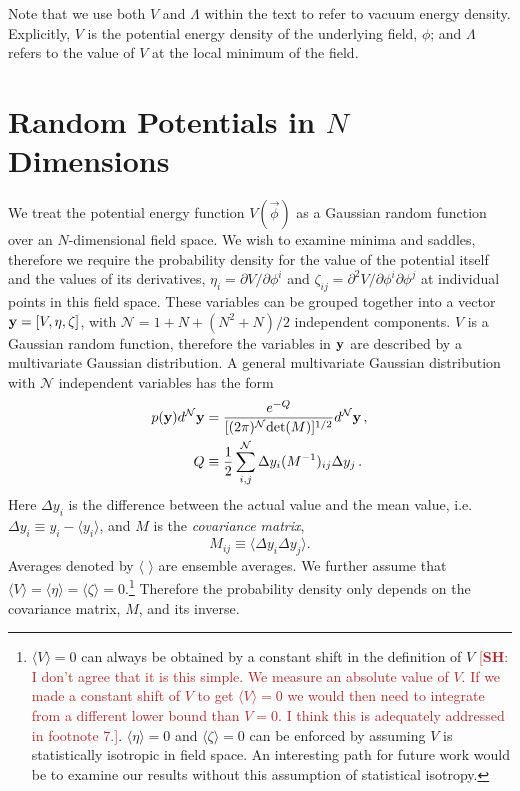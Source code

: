 \documentclass[12pt]{article}
\newcommand{\SH}[1]{\textcolor{brown}{[{\bf SH}: #1]}}
\begin{document}
Note that we use both $V$ and $\Lambda$ within the text to refer to vacuum energy density. Explicitly, $V$ is the potential energy density of the underlying field, $\phi$; and $\Lambda$ refers to the value of $V$ at the local minimum of the field.
 
 
\section{Random Potentials in $N$ Dimensions}

We treat the potential energy function $V({\vec{\phi}})$ as a Gaussian random function over an $N$-dimensional field space. We wish to examine minima and saddles, therefore we require the probability density for the value of the potential itself and the values of its derivatives, $\eta_i = \partial V/\partial \phi^i$ and $\zeta_{ij}=\partial^2 V/\partial \phi^i\partial \phi^j$ at individual points in this field space. These variables can be grouped together into a vector ${\bf y} = [V,\eta,\zeta]$, with $\mathcal{N}=1+N+(N^2+N)/2$ independent components. $V$ is a Gaussian random function, therefore the variables in ${\bf y}$ are described by a multivariate Gaussian distribution. A general multivariate Gaussian distribution with $\mathcal{N}$ independent variables has the form
\begin{equation} \label{MultivariateGaussian}
\begin{split}
p({\bf y})d^\mathcal{N}{\bf y} &= \frac{e^{-Q}}{[(2\pi)^\mathcal{N} \mathrm{det}(M)]^{1/2}} d^\mathcal{N}{\bf y} \, ,\\
Q &\equiv \frac{1}{2} \sum_{i,j}^\mathcal{N} \Delta y_i (M^{-1})_{ij} \Delta y_{j} \, .\\
\end{split}
\end{equation}
%
Here $\Delta y_i$ is the difference between the actual value and the mean value, i.e. $\Delta y_i \equiv y_i - \langle y_i \rangle$, and $M$ is the \emph{covariance matrix}, 
%
\begin{equation}
M_{ij} \equiv \langle \Delta y_i \Delta y_j \rangle.
\end{equation}
%
Averages denoted by $\langle \,\,\rangle$ are ensemble averages. We further assume that $\langle V\rangle = \langle \eta\rangle = \langle \zeta\rangle = 0$.\footnote{$\langle V\rangle=0$ can always be obtained by a constant shift in the definition of $V$ \SH{I don't agree that it is this simple. We measure an absolute value of $V$. If we made a constant shift of $V$ to get $\langle V \rangle = 0$ we would then need to integrate from a different lower bound than $V=0$. I think this is adequately addressed in footnote 7.}. $\langle \eta \rangle = 0$ and $\langle \zeta\rangle = 0$ can be enforced by assuming $V$ is statistically isotropic in field space. An interesting path for future work would be to examine our results without this assumption of statistical isotropy.} Therefore the probability density only depends on the covariance matrix, $M$, and its inverse.
\end{document}
